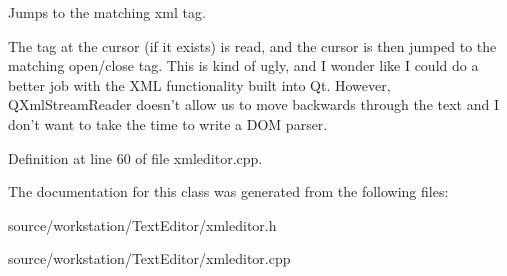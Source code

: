 Jumps to the matching xml tag. 

The tag at the cursor (if it exists) is read, and the cursor is then jumped to the matching open/close tag. This is kind of ugly, and I wonder like I could do a better job with the X\-M\-L functionality built into Qt. However, Q\-Xml\-Stream\-Reader doesn't allow us to move backwards through the text and I don't want to take the time to write a D\-O\-M parser. 

Definition at line 60 of file xmleditor.\-cpp.



The documentation for this class was generated from the following files\-:\begin{DoxyCompactItemize}
\item 
source/workstation/\-Text\-Editor/xmleditor.\-h\item 
source/workstation/\-Text\-Editor/xmleditor.\-cpp\end{DoxyCompactItemize}
